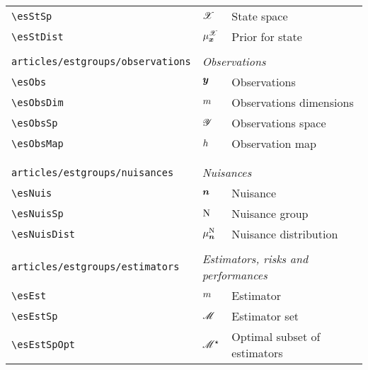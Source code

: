 \begin{longtable}{lll}
 {\color[rgb]{0.5,0.5,0.5}\texttt{\textbackslash esStSp}} & $\mathscr{X}$ &  State space\\ 
 {\color[rgb]{0.5,0.5,0.5}\texttt{\textbackslash esStDist}} & $\mu^{\mathscr{X}}_{\boldsymbol{x}}$ &  Prior for state\\ 
  &  & \\ 
 {\color[rgb]{0.5,0.5,0.5}\texttt{articles/estgroups/observations}} & \multicolumn{2}{l}{\emph{Observations}}\\ 
 \hline
{\color[rgb]{0.5,0.5,0.5}\texttt{\textbackslash esObs}} & $\boldsymbol{y}$ &  Observations\\ 
 {\color[rgb]{0.5,0.5,0.5}\texttt{\textbackslash esObsDim}} & $m$ &  Observations dimensions\\ 
 {\color[rgb]{0.5,0.5,0.5}\texttt{\textbackslash esObsSp}} & $\mathscr{Y}$ &  Observations space\\ 
 {\color[rgb]{0.5,0.5,0.5}\texttt{\textbackslash esObsMap}} & $h$ &  Observation map\\ 
  &  & {\setlength\fboxsep{1pt}%
\fbox{%
\color[rgb]{0.5,0.5,0.5}\begin{minipage}[]{8cm}%
$\esObs = \esNuis \esObsMap(\esSt)$\par%
{\small{\texttt{\$\textbackslash esObs = \textbackslash esNuis \textbackslash esObsMap(\textbackslash esSt)\$}}}\end{minipage}%
}%
}%
\\ 
  &  & \\ 
 {\color[rgb]{0.5,0.5,0.5}\texttt{articles/estgroups/nuisances}} & \multicolumn{2}{l}{\emph{Nuisances}}\\ 
 \hline
{\color[rgb]{0.5,0.5,0.5}\texttt{\textbackslash esNuis}} & $\boldsymbol{n}$ &  Nuisance\\ 
 {\color[rgb]{0.5,0.5,0.5}\texttt{\textbackslash esNuisSp}} & $\mathrm{N}$ &  Nuisance group\\ 
 {\color[rgb]{0.5,0.5,0.5}\texttt{\textbackslash esNuisDist}} & $\mu^{\mathrm{N}}_{\boldsymbol{n}}$ &  Nuisance distribution\\ 
  &  & \\ 
 {\color[rgb]{0.5,0.5,0.5}\texttt{articles/estgroups/estimators}} & \multicolumn{2}{l}{\emph{Estimators, risks and performances}}\\ 
 \hline
{\color[rgb]{0.5,0.5,0.5}\texttt{\textbackslash esEst}} & $m$ &  Estimator\\ 
 {\color[rgb]{0.5,0.5,0.5}\texttt{\textbackslash esEstSp}} & $\mathscr{M}$ &  Estimator set\\ 
 {\color[rgb]{0.5,0.5,0.5}\texttt{\textbackslash esEstSpOpt}} & $\mathscr{M}^\star$ &  Optimal subset of estimators\\ 

\end{longtable}
